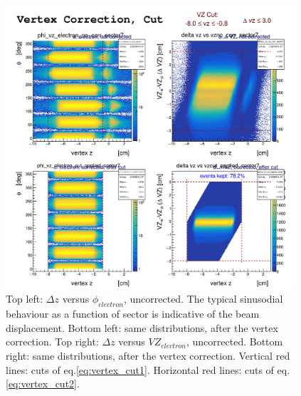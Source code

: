 \begin{figure}[h]
    \centering
    \includegraphics[width=0.96\textwidth ]{img/vtx_2D_all_sector}
    \caption{Top left: $\Delta z$ versus $\phi_{electron}$, uncorrected.
    The typical sinusodial behaviour as a function of sector is
    indicative of the beam displacement. Bottom left: same
    distributions, after the vertex correction.
    Top right:  $\Delta z$ versus $VZ_{electron}$, uncorrected. Bottom
    right: same distributions, after the vertex correction.
    Vertical red lines: cuts of eq.\ref{eq:vertex_cut1}.
    Horizontal red lines: cuts of eq.\ref{eq:vertex_cut2}.}
    \label{fig:vertex_corr_2D}
\end{figure}











